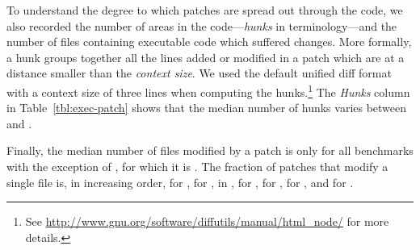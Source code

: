 
To understand the degree to which patches are spread out through the
code, we also recorded the number of areas in the
code---\textit{hunks} in \git terminology---and the number of files
containing executable code which suffered changes.  More formally, a
hunk groups together all the lines added or modified in a patch which
are at a distance smaller than the \textit{context size}.  We used the
default unified diff format with a context size of three lines when
computing the
hunks.\footnote{See \url{http://www.gnu.org/software/diffutils/manual/html_node/}
for more details.}  The \textit{Hunks} column in
Table~\ref{tbl:exec-patch} shows that the median number of hunks
varies between \binutilseHunkThreeMedian and \zeromqeHunkThreeMedian.

Finally, the median number of files modified by a patch is
only \rediseFileMedian for all benchmarks with the exception
of \zeromq, for which it is \zeromqeFileMedian. The fraction of
patches that modify a single file is, in increasing
order, \zeromqOneeFilePatches for \zeromq, \gitOneeFilePatches
for \git, \beanstalkdOneeFilePatches in \beanstalkd, \lighttpdtwoOneeFilePatches
for \lighttpdtwo, \memcachedOneeFilePatches
for \memcached, \redisOneeFilePatches for \redis,
and \binutilsOneeFilePatches for \binutils.



